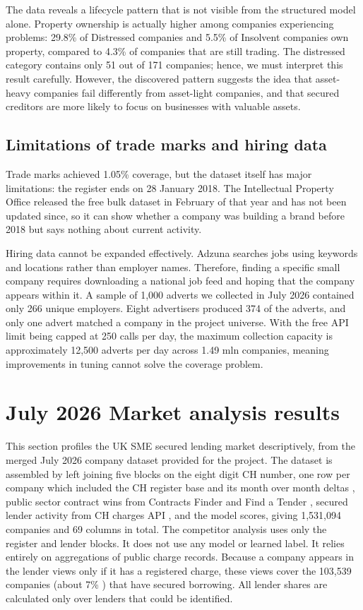 \documentclass[    author={Samuel Menon Demelo; Sneha Saphala Ram Prasad; 
Viktor Ander Lindholm; Vishal Khatri},
               supervisor={Prof. Fernando Moreno-Pino},
                   degree={MSc},
                    title={Lloyds Commercial Banking Intelligence},
                 subtitle={Ranking SME Lending, Risk and Growth Prospects for Lloyds Banking Group},
                     type={},
                     year={2026}]{dissertation}
\begin{document}
The data reveals a lifecycle pattern that is not visible from the structured model alone. Property ownership is actually higher among companies experiencing problems: 29.8\% of Distressed companies and 5.5\% of Insolvent companies own property, compared to 4.3\% of companies that are still trading. The distressed category contains only 51 out of 171 companies; hence, we must interpret this result carefully. However, the discovered pattern suggests the idea that asset-heavy companies fail differently from asset-light companies, and that secured creditors are more likely to focus on businesses with valuable assets.

\subsection{Limitations of trade marks and hiring data}

Trade marks achieved 1.05\% coverage, but the dataset itself has major limitations: the register ends on 28 January 2018. The Intellectual Property Office released the free bulk dataset in February of that year and has not been updated since, so it can show whether a company was building a brand before 2018 but says nothing about current activity.

Hiring data cannot be expanded effectively. Adzuna searches jobs using keywords and locations rather than employer names. Therefore, finding a specific small company requires downloading a national job feed and hoping that the company appears within it. A sample of 1,000 adverts we collected in July 2026 contained only 266 unique employers. Eight advertisers produced 374 of the adverts, and only one advert matched a company in the project universe. With the free API limit being capped at 250 calls per day, the maximum collection capacity is approximately 12,500 adverts per day across 1.49 mln companies, meaning improvements in tuning cannot solve the coverage problem.

\section{July 2026 Market analysis results}
This section profiles the UK SME secured lending market descriptively,  from the merged July 2026 company dataset provided for the project. The dataset is assembled by left joining five blocks on the eight digit CH number, one row per company which included the CH register base and its month over month deltas \cite{companieshouse_api}, public sector contract wins from Contracts Finder and Find a Tender \cite{contractsfinder, findatender, ocds}, secured lender activity from CH charges API \cite{companieshouse_api}, and the model scores, giving 1,531,094 companies and 69 columns in total. 
The competitor analysis uses only the register and lender blocks. It does not use any model or learned label. It relies entirely on aggregations of public charge records. Because a company appears in the lender views only if it has a registered charge, these views cover the 103,539 companies (about 7\% ) that have secured borrowing. All lender shares are calculated only over lenders that could be identified.
\end{document}

